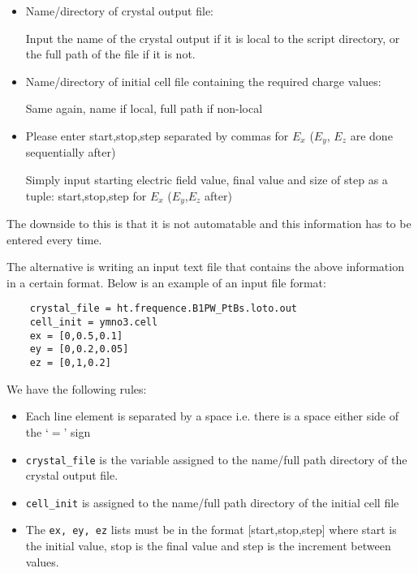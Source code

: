 \begin{itemize}
	\item Name/directory of crystal output file:
	
	Input the name of the crystal output if it is local to the script directory, or the full path of the file if it is not.
	
	\item Name/directory of initial cell file containing the required charge values:
	
	Same again, name if local, full path if non-local
	
	\item Please enter start,stop,step separated by commas for $E_x$ ($E_y$, $E_z$ are done sequentially after)
	
	Simply input starting electric field value, final value and size of step as a tuple: start,stop,step for $E_x$ ($E_y$,$E_z$ after)
\end{itemize}

The downside to this is that it is not automatable and this information has to be entered every time.

The alternative is writing an input text file that contains the above information in a certain format. Below is an example of an input file format:

\begin{lstlisting}
	crystal_file = ht.frequence.B1PW_PtBs.loto.out
	cell_init = ymno3.cell
	ex = [0,0.5,0.1]
	ey = [0,0.2,0.05]
	ez = [0,1,0.2]
\end{lstlisting}

We have the following rules:

\begin{itemize}
	\item Each line element is separated by a space i.e. there is a space either side of the `$=$' sign
	\item \texttt{crystal\_file} is the variable assigned to the name/full path directory of the crystal output file.
	\item \texttt{cell\_init} is assigned to the name/full path directory of the initial cell file
	\item The \texttt{ex, ey, ez} lists must be in the format [start,stop,step] where start is the initial value, stop is the final value and step is the increment between values.
\end{itemize}

